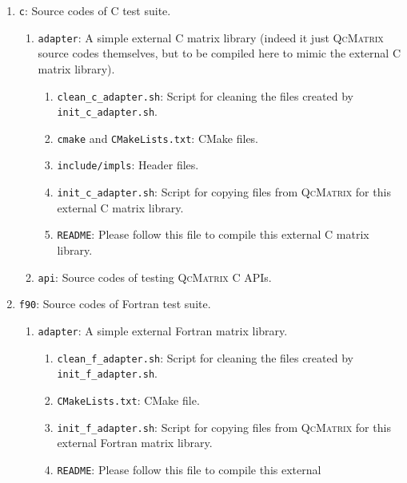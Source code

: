\documentclass[a4paper,11pt,twoside,openright]{book}
\begin{document}
\begin{enumerate}
\begin{enumerate}
      \item {\color{blue}\verb|c|}: Source codes of C test suite.
        \begin{enumerate}
          \item {\color{blue}\verb|adapter|}: A simple external C matrix library %
            (indeed it just \textsc{QcMatrix} source codes themselves, but to be %
            compiled here to mimic the external C matrix library).
            \begin{enumerate}
              \item {\color{green}\verb|clean_c_adapter.sh|}: Script for cleaning %
                the files created by {\color{green}\verb|init_c_adapter.sh|}.
              \item {\color{blue}\verb|cmake|} and \verb|CMakeLists.txt|: CMake files.
              \item {\color{blue}\verb|include/impls|}: Header files.
              \item {\color{green}\verb|init_c_adapter.sh|}: Script for copying files %
                from \textsc{QcMatrix} for this external C matrix library.
              \item \verb|README|: Please follow this file to compile this external %
                C matrix library.
            \end{enumerate}
          \item {\color{blue}\verb|api|}: Source codes of testing \textsc{QcMatrix} %
            C APIs.
        \end{enumerate}
      \item {\color{blue}\verb|f90|}: Source codes of Fortran test suite.
        \begin{enumerate}
          \item {\color{blue}\verb|adapter|}: A simple external Fortran matrix library.
            \begin{enumerate}
              \item {\color{green}\verb|clean_f_adapter.sh|}: Script for cleaning %
                the files created by {\color{green}\verb|init_f_adapter.sh|}.
              \item \verb|CMakeLists.txt|: CMake file.
              \item {\color{green}\verb|init_f_adapter.sh|}: Script for copying files %
                from \textsc{QcMatrix} for this external Fortran matrix library.
              \item \verb|README|: Please follow this file to compile this external %

\end{enumerate}
\end{enumerate}
\end{enumerate}
\end{enumerate}
\end{document}
